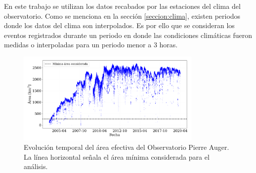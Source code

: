 En este trabajo se utilizan los datos recabados por las estaciones del clima del observatorio. Como se menciona en la sección \ref{seccion:clima}, existen periodos donde los datos del clima son interpolados. Es por ello que se consideran los eventos registrados durante un periodo en donde las condiciones climáticas fueron medidas o interpoladas para un periodo menor a 3 horas. %


\begin{figure}[H]
    \centering
    \includegraphics[width=0.8\textwidth]{Graphs/clima/area_v2.png}
    \caption{Evolución temporal del área efectiva del Observatorio Pierre Auger. La línea horizontal señala el área mínima considerada para el análisis.}
    \label{fig:area}
\end{figure}

